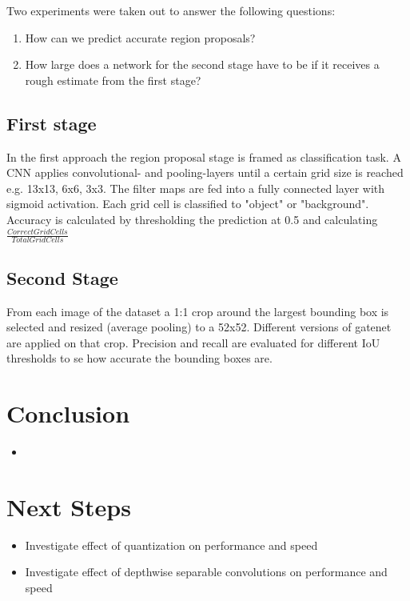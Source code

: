 \documentclass{article}
\begin{document}
Two experiments were taken out to answer the following questions:

\begin{enumerate}
	\item How can we predict accurate region proposals?
	\item How large does a network for the second stage have to be if it receives a rough estimate from the first stage?
\end{enumerate}

\subsection{ First stage}

In the first approach the region proposal stage is framed as classification task. A CNN applies convolutional- and pooling-layers until a certain grid size is reached e.g. 13x13, 6x6, 3x3. The filter maps are fed into a fully connected layer with sigmoid activation. Each grid cell is classified to "object" or "background". Accuracy is calculated by thresholding the prediction at 0.5 and calculating $\frac{Correct Grid Cells}{Total Grid Cells}$



\subsection{Second Stage}

From each image of the dataset a 1:1 crop around the largest bounding box is selected and resized (average pooling) to a 52x52. Different versions of gatenet are applied on that crop. Precision and recall are evaluated for different IoU thresholds to se how accurate the bounding boxes are.

\section{Conclusion}
\begin{itemize}
	\item
\end{itemize}

\section{Next Steps}
\begin{itemize}
	\item Investigate effect of quantization on performance and speed
	\item Investigate effect of depthwise separable convolutions on performance and speed
	
\end{itemize}

\newpage
\appendix






\end{document}
